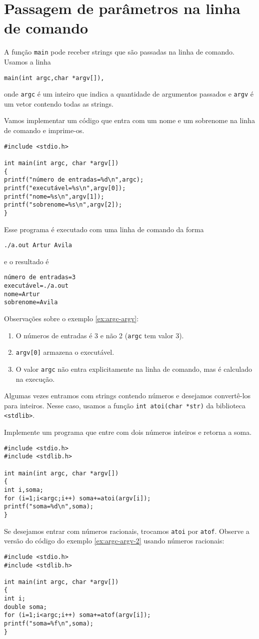 \section{Passagem de parâmetros na linha de comando}
A função \verb|main| pode receber strings que são passadas na linha de comando. Usamos a linha 
\begin{verbatim}
main(int argc,char *argv[]),
\end{verbatim}
onde \verb|argc| é um inteiro que indica a quantidade de argumentos passados e \verb|argv| é um vetor contendo todas as strings.
\begin{ex}\label{ex:argc-argv}Vamos implementar um código que entra com um nome e um sobrenome na linha de comando e imprime-os.
\end{ex}
\begin{verbatim}
#include <stdio.h>

int main(int argc, char *argv[])
{
printf("número de entradas=%d\n",argc);
printf("executável=%s\n",argv[0]);
printf("nome=%s\n",argv[1]);
printf("sobrenome=%s\n",argv[2]);
}
\end{verbatim}
Esse programa é executado com uma linha de comando da forma
\begin{verbatim}
./a.out Artur Avila
\end{verbatim}
e o resultado é
\begin{verbatim}
número de entradas=3
executável=./a.out
nome=Artur
sobrenome=Avila
\end{verbatim}

Observações sobre o exemplo \ref{ex:argc-argv}:
\begin{enumerate}
 \item O números de entradas é 3 e não 2 (\verb|argc| tem valor 3).
 \item \verb|argv[0]| armazena o executável.
 \item O valor \verb|argc| não entra explicitamente na linha de comando, mas é calculado na execução.
\end{enumerate}

Algumas vezes entramos com strings contendo números e desejamos convertê-los para inteiros. Nesse caso, usamos a função \verb|int atoi(char *str)| da biblioteca \verb|<stdlib>|.
\begin{ex}\label{ex:argc-argv-2}
Implemente um programa que entre com dois números inteiros e retorna a soma.
\end{ex}
\begin{verbatim}
#include <stdio.h>
#include <stdlib.h>

int main(int argc, char *argv[])
{
int i,soma;
for (i=1;i<argc;i++) soma+=atoi(argv[i]);
printf("soma=%d\n",soma);
}
\end{verbatim}
Se desejamos entrar com números racionais, trocamos \verb|atoi| por \verb|atof|. Observe a versão do código do exemplo \ref{ex:argc-argv-2} usando números racionais:
\begin{verbatim}
#include <stdio.h>
#include <stdlib.h>

int main(int argc, char *argv[])
{
int i;
double soma;
for (i=1;i<argc;i++) soma+=atof(argv[i]);
printf("soma=%f\n",soma);
}
\end{verbatim}


